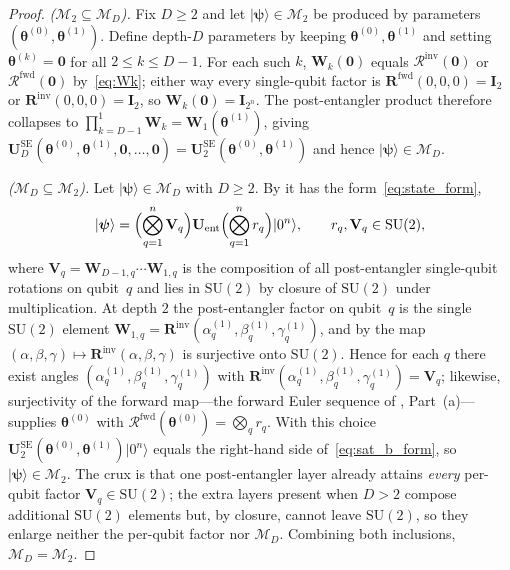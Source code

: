 \documentclass[11pt]{article}
\newcommand{\SU}{\mathrm{SU}}
\newcommand{\cM}{\mathcal{M}}
\theoremstyle{plain}
\theoremstyle{plain}
\begin{document}
\begin{proof}
\emph{($\cM_2\subseteq\cM_D$).} Fix $D\ge 2$ and let
$|\boldsymbol{\psi}\rangle\in\cM_2$ be produced by parameters
$(\bm\theta^{(0)},\bm\theta^{(1)})$. Define depth-$D$ parameters by
keeping $\bm\theta^{(0)},\bm\theta^{(1)}$ and setting
$\bm\theta^{(k)}=\bm 0$ for all $2\le k\le D-1$. For each such $k$,
$\mathbf{W}_k(\bm 0)$ equals $\mathcal{R}^{\mathrm{inv}}(\bm 0)$ or
$\mathcal{R}^{\mathrm{fwd}}(\bm 0)$ by~\eqref{eq:Wk}; either way every
single-qubit factor is $\mathbf{R}^{\mathrm{fwd}}(0,0,0)=\mathbf{I}_2$ or
$\mathbf{R}^{\mathrm{inv}}(0,0,0)=\mathbf{I}_2$, so $\mathbf{W}_k(\bm 0)=\mathbf{I}_{2^n}$. The
post-entangler product therefore collapses to
$\prod_{k=D-1}^{1}\mathbf{W}_k=\mathbf{W}_1(\bm\theta^{(1)})$, giving
$\mathbf{U}_D^{\mathrm{SE}}(\bm\theta^{(0)},\bm\theta^{(1)},\bm 0,\dots,\bm 0)
=\mathbf{U}_2^{\mathrm{SE}}(\bm\theta^{(0)},\bm\theta^{(1)})$ and hence
$|\boldsymbol{\psi}\rangle\in\cM_D$.

\emph{($\cM_D\subseteq\cM_2$).} Let $|\boldsymbol{\psi}\rangle\in\cM_D$ with
$D\ge 2$. By  it has the form~\eqref{eq:state_form},
\begin{equation}\label{eq:sat_b_form}
  |\boldsymbol{\psi}\rangle
  = \Bigl(\bigotimes_{q=1}^n \mathbf{V}_q\Bigr) \mathbf{U}_{\mathrm{ent}} 
    \Bigl(\bigotimes_{q=1}^n r_q\Bigr)|0^n\rangle,
  \qquad r_q,\mathbf{V}_q\in\SU(2),
\end{equation}
where $\mathbf{V}_q=\mathbf{W}_{D-1,q}\cdots\mathbf{W}_{1,q}$ is the composition of all
post-entangler single-qubit rotations on qubit~$q$ and lies in $\SU(2)$
by closure of $\SU(2)$ under multiplication. At depth $2$ the
post-entangler factor on qubit~$q$ is the single $\SU(2)$ element
$\mathbf{W}_{1,q}=\mathbf{R}^{\mathrm{inv}}(\alpha_q^{(1)},\beta_q^{(1)},\gamma_q^{(1)})$,
and by  the map
$(\alpha,\beta,\gamma)\mapsto\mathbf{R}^{\mathrm{inv}}(\alpha,\beta,\gamma)$ is
surjective onto $\SU(2)$. Hence for each $q$ there exist angles
$(\alpha_q^{(1)},\beta_q^{(1)},\gamma_q^{(1)})$ with
$\mathbf{R}^{\mathrm{inv}}(\alpha_q^{(1)},\beta_q^{(1)},\gamma_q^{(1)})=\mathbf{V}_q$;
likewise, surjectivity of the forward map---the forward Euler
sequence of , Part~(a)---supplies
$\bm\theta^{(0)}$ with
$\mathcal{R}^{\mathrm{fwd}}(\bm\theta^{(0)})=\bigotimes_q r_q$. With this
choice $\mathbf{U}_2^{\mathrm{SE}}(\bm\theta^{(0)},\bm\theta^{(1)})|0^n\rangle$
equals the right-hand side of~\eqref{eq:sat_b_form}, so
$|\boldsymbol{\psi}\rangle\in\cM_2$. The crux is that one post-entangler layer
already attains \emph{every} per-qubit factor $\mathbf{V}_q\in\SU(2)$; the extra
layers present when $D>2$ compose additional $\SU(2)$ elements but,
by closure, cannot leave $\SU(2)$, so they enlarge neither the per-qubit
factor nor $\cM_D$. Combining both inclusions, $\cM_D=\cM_2$.


\end{proof}
\end{document}
